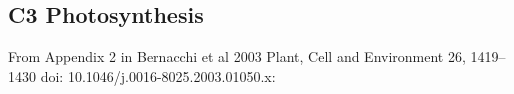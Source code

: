 \documentclass[10pt]{article}
\begin{document}
\newpage
\subsection*{C3 Photosynthesis}

From Appendix 2 in Bernacchi et al 2003 Plant, Cell and Environment 26, 1419–1430  doi: 10.1046/j.0016-8025.2003.01050.x:
\end{document}
